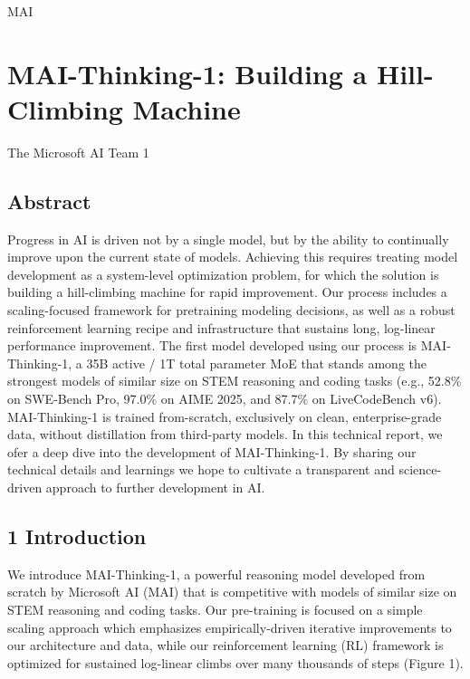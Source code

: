 \documentclass[
  10
]{article}
\author{}
\date{}
\begin{document}
MAI

\section{MAI-Thinking-1: Building a Hill-Climbing
Machine}\label{mai-thinking-1-building-a-hill-climbing-machine}

The Microsoft AI Team 1

\subsection{Abstract}\label{abstract}

Progress in AI is driven not by a single model, but by the ability to
continually improve upon the current state of models. Achieving this
requires treating model development as a system-level optimization
problem, for which the solution is building a hill-climbing machine for
rapid improvement. Our process includes a scaling-focused framework for
pretraining modeling decisions, as well as a robust reinforcement
learning recipe and infrastructure that sustains long, log-linear
performance improvement. The first model developed using our process is
MAI-Thinking-1, a 35B active / 1T total parameter MoE that stands among
the strongest models of similar size on STEM reasoning and coding tasks
(e.g., 52.8\% on SWE-Bench Pro, 97.0\% on AIME 2025, and 87.7\% on
LiveCodeBench v6). MAI-Thinking-1 is trained from-scratch, exclusively
on clean, enterprise-grade data, without distillation from third-party
models. In this technical report, we ofer a deep dive into the
development of MAI-Thinking-1. By sharing our technical details and
learnings we hope to cultivate a transparent and science-driven approach
to further development in AI.

\subsection{1 Introduction}\label{introduction}

We introduce MAI-Thinking-1, a powerful reasoning model developed from
scratch by Microsoft AI (MAI) that is competitive with models of similar
size on STEM reasoning and coding tasks. Our pre-training is focused on
a simple scaling approach which emphasizes empirically-driven iterative
improvements to our architecture and data, while our reinforcement
learning (RL) framework is optimized for sustained log-linear climbs
over many thousands of steps (Figure 1).
\end{document}
